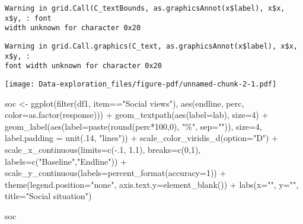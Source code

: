 \documentclass[
  letterpaper,
  DIV=11,
  numbers=noendperiod]{scrreprt}
\newenvironment{Shaded}{\begin{snugshade}}{\end{snugshade}}
\newcommand{\AttributeTok}[1]{\textcolor[rgb]{0.40,0.45,0.13}{#1}}
\newcommand{\DecValTok}[1]{\textcolor[rgb]{0.68,0.00,0.00}{#1}}
\newcommand{\FloatTok}[1]{\textcolor[rgb]{0.68,0.00,0.00}{#1}}
\newcommand{\FunctionTok}[1]{\textcolor[rgb]{0.28,0.35,0.67}{#1}}
\newcommand{\NormalTok}[1]{\textcolor[rgb]{0.00,0.23,0.31}{#1}}
\newcommand{\OtherTok}[1]{\textcolor[rgb]{0.00,0.23,0.31}{#1}}
\newcommand{\SpecialCharTok}[1]{\textcolor[rgb]{0.37,0.37,0.37}{#1}}
\newcommand{\StringTok}[1]{\textcolor[rgb]{0.13,0.47,0.30}{#1}}
\begin{document}
\begin{verbatim}
Warning in grid.Call(C_textBounds, as.graphicsAnnot(x$label), x$x, x$y, : font
width unknown for character 0x20
\end{verbatim}

\begin{verbatim}
Warning in grid.Call.graphics(C_text, as.graphicsAnnot(x$label), x$x, x$y, :
font width unknown for character 0x20
\end{verbatim}

\texttt{[image: Data-exploration\_files/figure-pdf/unnamed-chunk-2-1.pdf]}

\begin{Shaded}
\begin{Highlighting}[]
\NormalTok{soc }\OtherTok{\textless{}{-}} \FunctionTok{ggplot}\NormalTok{(}\FunctionTok{filter}\NormalTok{(df1, item}\SpecialCharTok{==}\StringTok{"Social views"}\NormalTok{), }\FunctionTok{aes}\NormalTok{(endline, perc, }\AttributeTok{color=}\FunctionTok{as.factor}\NormalTok{(response))) }\SpecialCharTok{+} 
  \FunctionTok{geom\_textpath}\NormalTok{(}\FunctionTok{aes}\NormalTok{(}\AttributeTok{label=}\NormalTok{lab),}
                \AttributeTok{size=}\DecValTok{4}\NormalTok{) }\SpecialCharTok{+}
  \FunctionTok{geom\_label}\NormalTok{(}\FunctionTok{aes}\NormalTok{(}\AttributeTok{label=}\FunctionTok{paste}\NormalTok{(}\FunctionTok{round}\NormalTok{(perc}\SpecialCharTok{*}\DecValTok{100}\NormalTok{,}\DecValTok{0}\NormalTok{), }\StringTok{"\%"}\NormalTok{, }\AttributeTok{sep=}\StringTok{""}\NormalTok{)),}
             \AttributeTok{size=}\DecValTok{4}\NormalTok{,}
             \AttributeTok{label.padding =} \FunctionTok{unit}\NormalTok{(.}\DecValTok{14}\NormalTok{, }\StringTok{"lines"}\NormalTok{)) }\SpecialCharTok{+}
  \FunctionTok{scale\_color\_viridis\_d}\NormalTok{(}\AttributeTok{option=}\StringTok{"D"}\NormalTok{) }\SpecialCharTok{+}
  \FunctionTok{scale\_x\_continuous}\NormalTok{(}\AttributeTok{limits=}\FunctionTok{c}\NormalTok{(}\SpecialCharTok{{-}}\NormalTok{.}\DecValTok{1}\NormalTok{, }\FloatTok{1.1}\NormalTok{),}
                     \AttributeTok{breaks=}\FunctionTok{c}\NormalTok{(}\DecValTok{0}\NormalTok{,}\DecValTok{1}\NormalTok{),}
                     \AttributeTok{labels=}\FunctionTok{c}\NormalTok{(}\StringTok{"Baseline"}\NormalTok{,}\StringTok{"Endline"}\NormalTok{)) }\SpecialCharTok{+}
  \FunctionTok{scale\_y\_continuous}\NormalTok{(}\AttributeTok{labels=}\FunctionTok{percent\_format}\NormalTok{(}\AttributeTok{accuracy=}\DecValTok{1}\NormalTok{)) }\SpecialCharTok{+}
  \FunctionTok{theme}\NormalTok{(}\AttributeTok{legend.position=}\StringTok{"none"}\NormalTok{,}
        \AttributeTok{axis.text.y=}\FunctionTok{element\_blank}\NormalTok{()) }\SpecialCharTok{+}
  \FunctionTok{labs}\NormalTok{(}\AttributeTok{x=}\StringTok{""}\NormalTok{,}
       \AttributeTok{y=}\StringTok{""}\NormalTok{,}
       \AttributeTok{title=}\StringTok{"Social situation"}\NormalTok{) }

\NormalTok{soc}
\end{Highlighting}
\end{Shaded}
\end{document}
